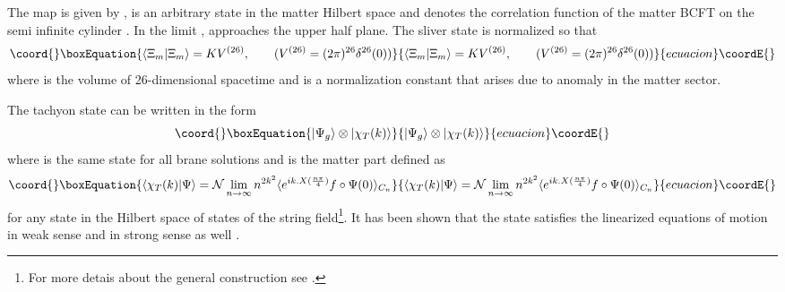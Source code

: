 \documentclass[a4paper,12pt]{article}
\begin{document}
The map \coordHE{} is given by \coordHE{}, \myHighlight{$|\Phi\rangle$}\coordHE{} is an arbitrary state 
in the matter Hilbert space and
\coordHE{} denotes the correlation function of the matter
BCFT on the semi infinite cylinder \coordHE{}. In the limit \coordHE{}, \coordHE{} 
approaches the upper half \coordHE{} plane. The sliver state is
normalized so that
\begin{equation}\coord{}\boxEquation{
\langle\Xi_m|\Xi_m\rangle=KV^{(26)}, \qquad (V^{(26)}=(2\pi)^{26}
\delta^{26}(0))
\label{8}
}{
\langle\Xi_m|\Xi_m\rangle=KV^{(26)}, \qquad (V^{(26)}=(2\pi)^{26}
\delta^{26}(0))
}{ecuacion}\coordE{}\end{equation}
where \coordHE{} is the volume of 26-dimensional spacetime and \coordHE{} is a
normalization constant that arises due to anomaly in the matter sector.

The tachyon state can be written in the form \cite{hk,rsz4,rv}
\begin{equation}\coord{}\boxEquation{
|\Psi_g\rangle\otimes|\chi_T(k)\rangle
\label{9}
}{
|\Psi_g\rangle\otimes|\chi_T(k)\rangle
}{ecuacion}\coordE{}\end{equation}
where \coordHE{} is the same state for all brane solutions and
\coordHE{} is the matter part defined as
\begin{equation}\coord{}\boxEquation{
\langle\chi_T(k)|\Psi\rangle=\mathcal{N}\lim_{n\to\infty} n^{2k^2}
\langle e^{ik.X(\frac{n\pi}{4})}f\circ\Psi(0)\rangle_{C_n} 
\label{10}
}{
\langle\chi_T(k)|\Psi\rangle=\mathcal{N}\lim_{n\to\infty} n^{2k^2}
\langle e^{ik.X(\frac{n\pi}{4})}f\circ\Psi(0)\rangle_{C_n} 
}{ecuacion}\coordE{}\end{equation}
for any state  \myHighlight{$|\Psi\rangle$}\coordHE{} in the Hilbert space of states of the string 
field\footnote{For more detais about the general construction see
\cite{rsz3,rsz}.}. It has been shown that the state \coordHE{} 
satisfies the linearized equations of motion in weak sense \cite{rsz4} and
in strong sense as well \cite{rv}.
\end{document}

